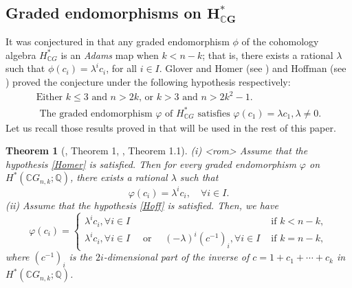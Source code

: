 \documentclass{amsart}
\newtheorem{theorem}{Theorem}[section]
\begin{document}
	\subsection{Graded endomorphisms on $\mathbf{H^*_{\mathbb{C}G}}$}
	It was conjectured in \cite{O} that any graded endomorphism $\phi$ of the cohomology algebra $H^*_{\mathbb{C}G}$ is an\textit{ Adams }map when $k < n - k$; that is, there exists a rational $\lambda$ such that
	$\phi(c_i) = \lambda^i c_i$, for all $ i \in I.$ Glover and Homer (see \cite{glover-homer}) and Hoffman (see \cite{hoffman}) proved the conjecture under the following hypothesis respectively:
	\begin{align}
		\text{Either } k \leq 3 \text{ and } n > 2k \text{, or } k>3 \text{ and } n>2k^2 -1. \label{Homer}\\
		\text{ The graded endomorphism } \varphi  \text{ of } H^*_{\mathbb{C}G} \text{ satisfies } \varphi(c_1) = \lambda c_1, \lambda\neq 0.  \label{Hoff}
	\end{align}
	Let us recall those results proved in \cite{glover-homer, hoffman} that will be used in the rest of this %
paper.  
	\begin{theorem}[\cite{glover-homer}, Theorem 1, \cite{hoffman}, Theorem 1.1]\label{hom and hof}
		(i) <rom> Assume %
that the hypothesis \eqref{Homer} is satisfied. Then for every graded endomorphism $\varphi$ on $ H^*(\mathbb{C}G_{n,k}; \mathbb{Q})$, there exists a rational $\lambda$ such %
that
		\[\varphi(c_i) = \lambda^i c_i,  \quad \forall i \in I.\]
		(ii) Assume %
that the hypothesis \eqref{Hoff} is satisfied. Then, we have
		$$\varphi(c_i) = \begin{cases}
			\lambda^i c_i,   \forall i \in I& \text{ if } k<n-k,\\
			\lambda^i c_i,  \forall i \in I \quad \text{ or } \quad(-\lambda)^i (c^{-1})_i,    \forall i \in I & \text{ if } k= n-k,
		\end{cases}$$
		where $ (c^{-1})_i $ is the $ 2i $-dimensional part of the inverse of $ c = 1 + c_1 + \cdots + c_k $ in $ H^*(\mathbb CG_{n,k}; \mathbb{Q}) $.
	\end{theorem}
	
\end{document}
